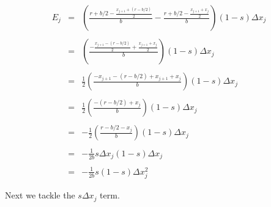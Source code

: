 \documentclass{article}
\begin{document}
\[
\begin{array}{rcl}
    E_j &=& \displaystyle
            \left(
            \frac{
                r + b/2 -
                \frac{x_{j+1} + (r - b/2)}{2}
            }{b}
            -
            \frac{
                r + b/2 -
                \frac{x_{j+1} + x_j}{2}
            }{b}
            \right) (1 - s) \Delta x_j \\
        & & \\
        &=& \displaystyle
            \left(
            \frac{
                - \frac{x_{j+1} - (r - b/2)}{2}
                + \frac{x_{j+1} + x_j}{2}
            }{b}
            \right) (1 - s) \Delta x_j \\
        & & \\
        &=& \displaystyle
            \frac{1}{2}
            \left(
                \frac{
                    - x_{j+1} - (r - b/2)
                    + x_{j+1} + x_j
                }{b}
            \right) (1 - s) \Delta x_j \\
        & & \\
        &=& \displaystyle
            \frac{1}{2}
            \left(
                \frac{
                    -(r - b/2) + x_j
                }{b}
            \right) (1 - s) \Delta x_j \\
        & & \\
        &=& \displaystyle
            -\frac{1}{2}
            \left(
                \frac{
                    r - b/2 - x_j
                }{b}
            \right) (1 - s) \Delta x_j \\
        & & \\
        &=& \displaystyle
            -\frac{1}{2b}
            s\Delta x_j (1 - s) \Delta x_j \\
            & & \\
            &=& \displaystyle
            -\frac{1}{2b} s(1 - s) \Delta x_j^2
\end{array}
\]

\noindent
Next we tackle the $s\Delta x_j$ term. 
\end{document}
